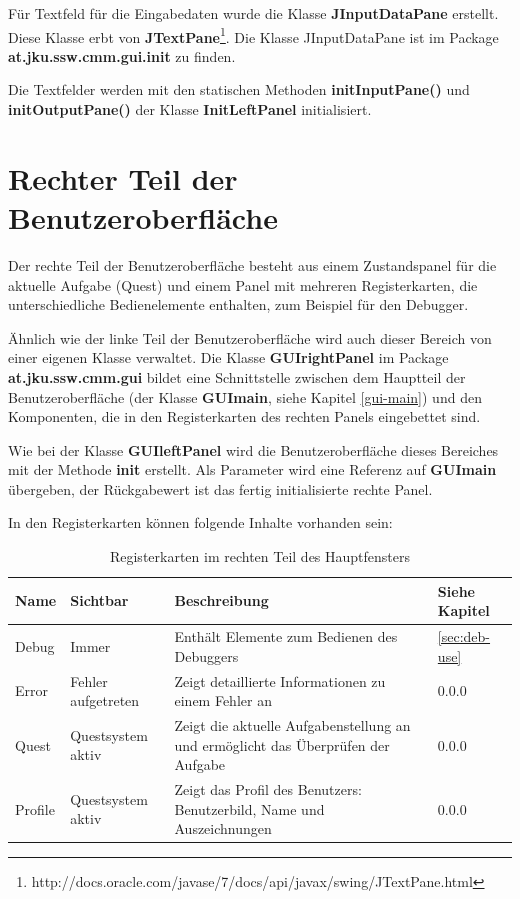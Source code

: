 Für Textfeld für die Eingabedaten wurde die Klasse \textbf{JInputDataPane} erstellt. Diese Klasse erbt von \textbf{JTextPane}\footnote{http://docs.oracle.com/javase/7/docs/api/javax/swing/JTextPane.html}. Die Klasse JInputDataPane ist im Package \textbf{at.jku.ssw.cmm.gui.init} zu finden. 

Die Textfelder werden mit den statischen Methoden \textbf{initInputPane()} und \textbf{initOutputPane()} der Klasse \textbf{InitLeftPanel} initialisiert.

\section{Rechter Teil der Benutzeroberfläche}
Der rechte Teil der Benutzeroberfläche besteht aus einem Zustandspanel für die aktuelle Aufgabe (Quest) und einem Panel mit mehreren Registerkarten, die unterschiedliche Bedienelemente enthalten, zum Beispiel für den Debugger.

Ähnlich wie der linke Teil der Benutzeroberfläche wird auch dieser Bereich von einer eigenen Klasse verwaltet. Die Klasse \textbf{GUIrightPanel} im Package \textbf{at.jku.ssw.cmm.gui} bildet eine Schnittstelle zwischen dem Hauptteil der Benutzeroberfläche (der Klasse \textbf{GUImain}, siehe Kapitel \ref{gui-main}) und den Komponenten, die in den Registerkarten des rechten Panels eingebettet sind.

Wie bei der Klasse \textbf{GUIleftPanel} wird die Benutzeroberfläche dieses Bereiches mit der Methode \textbf{init} erstellt. Als Parameter wird eine Referenz auf \textbf{GUImain} übergeben, der Rückgabewert ist das fertig initialisierte rechte Panel.

In den Registerkarten können folgende Inhalte vorhanden sein:
\def\arraystretch{1.6}
\begin{table}[h!]
\begin{tabular}{|l|p{2.5cm}|p{6.6cm}|l|}
\hline
\textbf{Name}&\textbf{Sichtbar}&\textbf{Beschreibung}&\textbf{Siehe Kapitel}\\
\hline
Debug&Immer&Enthält Elemente zum Bedienen des Debuggers&\ref{sec:deb-use}\\
Error&Fehler aufgetreten&Zeigt detaillierte Informationen zu einem Fehler an&0.0.0\\ %
Quest&Questsystem aktiv&Zeigt die aktuelle Aufgabenstellung an und ermöglicht das Überprüfen der Aufgabe&0.0.0\\ %
Profile&Questsystem aktiv&Zeigt das Profil des Benutzers: Benutzerbild, Name und Auszeichnungen&0.0.0\\ %
\hline
\end{tabular}
\caption{Registerkarten im rechten Teil des Hauptfensters}\label{tab:gui-main-right-reg}
\end{table}

